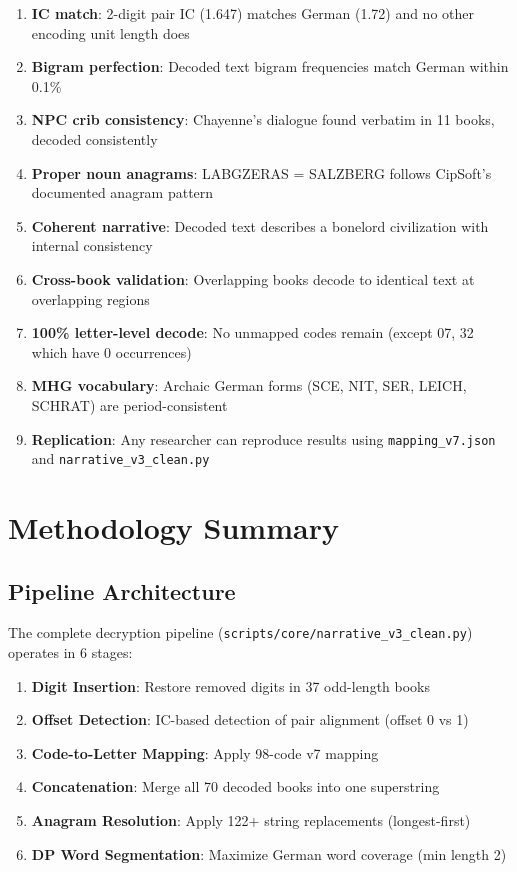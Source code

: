 \documentclass[11pt,a4paper]{article}
\begin{document}
\begin{enumerate}
\item \textbf{IC match}: 2-digit pair IC (1.647) matches German (1.72) and no other encoding unit length does
\item \textbf{Bigram perfection}: Decoded text bigram frequencies match German within 0.1\%
\item \textbf{NPC crib consistency}: Chayenne's dialogue found verbatim in 11 books, decoded consistently
\item \textbf{Proper noun anagrams}: LABGZERAS = SALZBERG follows CipSoft's documented anagram pattern
\item \textbf{Coherent narrative}: Decoded text describes a bonelord civilization with internal consistency
\item \textbf{Cross-book validation}: Overlapping books decode to identical text at overlapping regions
\item \textbf{100\% letter-level decode}: No unmapped codes remain (except 07, 32 which have 0 occurrences)
\item \textbf{MHG vocabulary}: Archaic German forms (SCE, NIT, SER, LEICH, SCHRAT) are period-consistent
\item \textbf{Replication}: Any researcher can reproduce results using \texttt{mapping\allowbreak\_v7.json} and \texttt{narrative\allowbreak\_v3\allowbreak\_clean.py}
\end{enumerate}

\section{Methodology Summary}

\subsection{Pipeline Architecture}

The complete decryption pipeline (\texttt{scripts/core/narrative\_v3\_clean.py}) operates in 6 stages:

\begin{enumerate}
\item \textbf{Digit Insertion}: Restore removed digits in 37 odd-length books
\item \textbf{Offset Detection}: IC-based detection of pair alignment (offset 0 vs 1)
\item \textbf{Code-to-Letter Mapping}: Apply 98-code v7 mapping
\item \textbf{Concatenation}: Merge all 70 decoded books into one superstring
\item \textbf{Anagram Resolution}: Apply 122+ string replacements (longest-first)
\item \textbf{DP Word Segmentation}: Maximize German word coverage (min length 2)
\end{enumerate}
\end{document}

